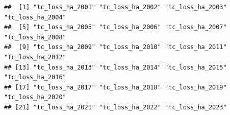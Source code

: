 \documentclass[
]{article}
\newenvironment{Shaded}{\begin{snugshade}}{\end{snugshade}}
\newcommand{\AttributeTok}[1]{\textcolor[rgb]{0.13,0.29,0.53}{#1}}
\newcommand{\CommentTok}[1]{\textcolor[rgb]{0.56,0.35,0.01}{\textit{#1}}}
\newcommand{\FunctionTok}[1]{\textcolor[rgb]{0.13,0.29,0.53}{\textbf{#1}}}
\newcommand{\NormalTok}[1]{#1}
\newcommand{\SpecialCharTok}[1]{\textcolor[rgb]{0.81,0.36,0.00}{\textbf{#1}}}
\newcommand{\StringTok}[1]{\textcolor[rgb]{0.31,0.60,0.02}{#1}}
\begin{document}
\begin{Shaded}
\end{Shaded}

\begin{verbatim}
##  [1] "tc_loss_ha_2001" "tc_loss_ha_2002" "tc_loss_ha_2003" "tc_loss_ha_2004"
##  [5] "tc_loss_ha_2005" "tc_loss_ha_2006" "tc_loss_ha_2007" "tc_loss_ha_2008"
##  [9] "tc_loss_ha_2009" "tc_loss_ha_2010" "tc_loss_ha_2011" "tc_loss_ha_2012"
## [13] "tc_loss_ha_2013" "tc_loss_ha_2014" "tc_loss_ha_2015" "tc_loss_ha_2016"
## [17] "tc_loss_ha_2017" "tc_loss_ha_2018" "tc_loss_ha_2019" "tc_loss_ha_2020"
## [21] "tc_loss_ha_2021" "tc_loss_ha_2022" "tc_loss_ha_2023"
\end{verbatim}
\end{document}
